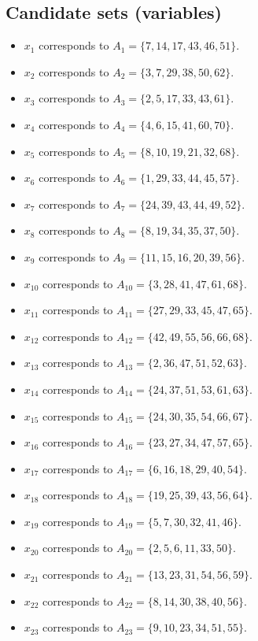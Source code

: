 \documentclass[11pt]{article}
\begin{document}
\subsection*{Candidate sets (variables)}
\begin{itemize}
\item $x_{1}$ corresponds to $A_{1}=\{7, 14, 17, 43, 46, 51\}$.
\item $x_{2}$ corresponds to $A_{2}=\{3, 7, 29, 38, 50, 62\}$.
\item $x_{3}$ corresponds to $A_{3}=\{2, 5, 17, 33, 43, 61\}$.
\item $x_{4}$ corresponds to $A_{4}=\{4, 6, 15, 41, 60, 70\}$.
\item $x_{5}$ corresponds to $A_{5}=\{8, 10, 19, 21, 32, 68\}$.
\item $x_{6}$ corresponds to $A_{6}=\{1, 29, 33, 44, 45, 57\}$.
\item $x_{7}$ corresponds to $A_{7}=\{24, 39, 43, 44, 49, 52\}$.
\item $x_{8}$ corresponds to $A_{8}=\{8, 19, 34, 35, 37, 50\}$.
\item $x_{9}$ corresponds to $A_{9}=\{11, 15, 16, 20, 39, 56\}$.
\item $x_{10}$ corresponds to $A_{10}=\{3, 28, 41, 47, 61, 68\}$.
\item $x_{11}$ corresponds to $A_{11}=\{27, 29, 33, 45, 47, 65\}$.
\item $x_{12}$ corresponds to $A_{12}=\{42, 49, 55, 56, 66, 68\}$.
\item $x_{13}$ corresponds to $A_{13}=\{2, 36, 47, 51, 52, 63\}$.
\item $x_{14}$ corresponds to $A_{14}=\{24, 37, 51, 53, 61, 63\}$.
\item $x_{15}$ corresponds to $A_{15}=\{24, 30, 35, 54, 66, 67\}$.
\item $x_{16}$ corresponds to $A_{16}=\{23, 27, 34, 47, 57, 65\}$.
\item $x_{17}$ corresponds to $A_{17}=\{6, 16, 18, 29, 40, 54\}$.
\item $x_{18}$ corresponds to $A_{18}=\{19, 25, 39, 43, 56, 64\}$.
\item $x_{19}$ corresponds to $A_{19}=\{5, 7, 30, 32, 41, 46\}$.
\item $x_{20}$ corresponds to $A_{20}=\{2, 5, 6, 11, 33, 50\}$.
\item $x_{21}$ corresponds to $A_{21}=\{13, 23, 31, 54, 56, 59\}$.
\item $x_{22}$ corresponds to $A_{22}=\{8, 14, 30, 38, 40, 56\}$.
\item $x_{23}$ corresponds to $A_{23}=\{9, 10, 23, 34, 51, 55\}$.

\end{itemize}
\end{document}
